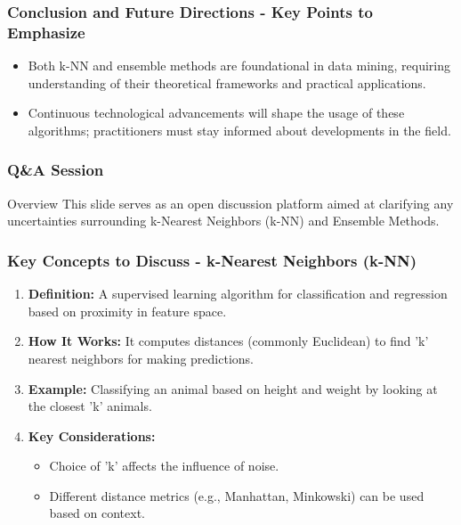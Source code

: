\documentclass[aspectratio=169]{beamer}
\begin{document}
\begin{frame}[fragile]
    \frametitle{Conclusion and Future Directions - Key Points to Emphasize}
    \begin{itemize}
        \item Both k-NN and ensemble methods are foundational in data mining, requiring understanding of their theoretical frameworks and practical applications.
        \item Continuous technological advancements will shape the usage of these algorithms; practitioners must stay informed about developments in the field.
    \end{itemize}
\end{frame}

\begin{frame}[fragile]
    \frametitle{Q\&A Session}
    \begin{block}{Overview}
        This slide serves as an open discussion platform aimed at clarifying any uncertainties surrounding k-Nearest Neighbors (k-NN) and Ensemble Methods.
    \end{block}
\end{frame}

\begin{frame}[fragile]
    \frametitle{Key Concepts to Discuss - k-Nearest Neighbors (k-NN)}
    \begin{enumerate}
        \item \textbf{Definition:} A supervised learning algorithm for classification and regression based on proximity in feature space.
        
        \item \textbf{How It Works:} It computes distances (commonly Euclidean) to find 'k' nearest neighbors for making predictions.
        
        \item \textbf{Example:} Classifying an animal based on height and weight by looking at the closest 'k' animals.
        
        \item \textbf{Key Considerations:} 
        \begin{itemize}
            \item Choice of 'k' affects the influence of noise.
            \item Different distance metrics (e.g., Manhattan, Minkowski) can be used based on context.
        \end{itemize}
    \end{enumerate}
\end{frame}
\end{document}

